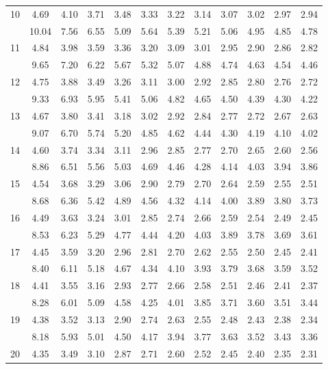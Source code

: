 \documentclass[lang=cn,10pt]{elegantbook}
\begin{document}
\begin{longtable}{c|ccccccccccc}
    10 & 4.69 & 4.10 & 3.71 & 3.48 & 3.33 & 3.22 & 3.14 & 3.07 & 3.02 & 2.97 & 2.94 \\
      & 10.04 & 7.56 & 6.55 & 5.09 & 5.64 & 5.39 & 5.21 & 5.06 & 4.95 & 4.85 & 4.78 \\
    11 & 4.84 & 3.98 & 3.59 & 3.36 & 3.20 & 3.09 & 3.01 & 2.95 & 2.90 & 2.86 & 2.82 \\
       & 9.65 & 7.20 & 6.22 & 5.67 & 5.32 & 5.07 & 4.88 & 4.74 & 4.63 & 4.54 & 4.46 \\
    12 & 4.75 & 3.88 & 3.49 & 3.26 & 3.11 & 3.00 & 2.92 & 2.85 & 2.80 & 2.76 & 2.72 \\
       & 9.33 & 6.93 & 5.95 & 5.41 & 5.06 & 4.82 & 4.65 & 4.50 & 4.39 & 4.30 & 4.22 \\
    13 & 4.67 & 3.80 & 3.41 & 3.18 & 3.02 & 2.92 & 2.84 & 2.77 & 2.72 & 2.67 & 2.63 \\
       & 9.07 & 6.70 & 5.74 & 5.20 & 4.85 & 4.62 & 4.44 & 4.30 & 4.19 & 4.10 & 4.02 \\
    14 & 4.60 & 3.74 & 3.34 & 3.11 & 2.96 & 2.85 & 2.77 & 2.70 & 2.65 & 2.60 & 2.56 \\
       & 8.86 & 6.51 & 5.56 & 5.03 & 4.69 & 4.46 & 4.28 & 4.14 & 4.03 & 3.94 & 3.86 \\
    15 & 4.54 & 3.68 & 3.29 & 3.06 & 2.90 & 2.79 & 2.70 & 2.64 & 2.59 & 2.55 & 2.51 \\
       & 8.68 & 6.36 & 5.42 & 4.89 & 4.56 & 4.32 & 4.14 & 4.00 & 3.89 & 3.80 & 3.73 \\
    16 & 4.49 & 3.63 & 3.24 & 3.01 & 2.85 & 2.74 & 2.66 & 2.59 & 2.54 & 2.49 & 2.45 \\
       & 8.53 & 6.23 & 5.29 & 4.77 & 4.44 & 4.20 & 4.03 & 3.89 & 3.78 & 3.69 & 3.61 \\
    17 & 4.45 & 3.59 & 3.20 & 2.96 & 2.81 & 2.70 & 2.62 & 2.55 & 2.50 & 2.45 & 2.41 \\
       & 8.40 & 6.11 & 5.18 & 4.67 & 4.34 & 4.10 & 3.93 & 3.79 & 3.68 & 3.59 & 3.52 \\
    18 & 4.41 & 3.55 & 3.16 & 2.93 & 2.77 & 2.66 & 2.58 & 2.51 & 2.46 & 2.41 & 2.37 \\
       & 8.28 & 6.01 & 5.09 & 4.58 & 4.25 & 4.01 & 3.85 & 3.71 & 3.60 & 3.51 & 3.44 \\
    19 & 4.38 & 3.52 & 3.13 & 2.90 & 2.74 & 2.63 & 2.55 & 2.48 & 2.43 & 2.38 & 2.34 \\
       & 8.18 & 5.93 & 5.01 & 4.50 & 4.17 & 3.94 & 3.77 & 3.63 & 3.52 & 3.43 & 3.36 \\
    20 & 4.35 & 3.49 & 3.10 & 2.87 & 2.71 & 2.60 & 2.52 & 2.45 & 2.40 & 2.35 & 2.31 \\

\end{longtable}
\end{document}
